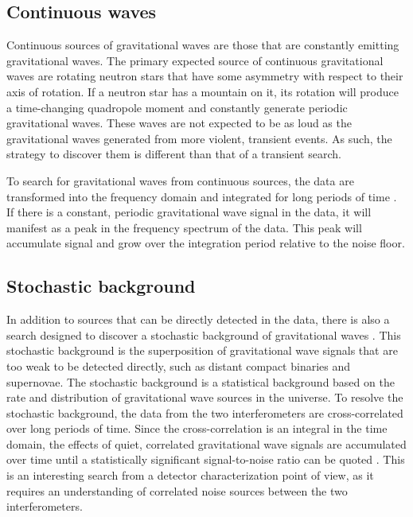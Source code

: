 \subsection{Continuous waves}

Continuous sources of gravitational waves are those that are constantly emitting 
gravitational waves. The primary expected source of continuous gravitational 
waves are rotating neutron stars that have some asymmetry with respect to their 
axis of rotation. If a neutron star has a mountain on it, its rotation will 
produce a time-changing quadropole moment and constantly generate periodic 
gravitational waves. These waves are not expected to be as loud as the 
gravitational waves generated from more violent, transient events. As such, 
the strategy to discover them is different than that of a transient search.

To search for gravitational waves from continuous sources, the data are 
transformed into the frequency domain and integrated for long periods of 
time \cite{CW-all-sky,EinsteinHome}. 
If there is a constant, periodic gravitational wave signal in the data, it 
will manifest as a peak in the frequency spectrum of the data. This peak will 
accumulate signal and grow over the integration period relative to the 
noise floor. 

\subsection{Stochastic background}

In addition to sources that can be directly detected in the data, there is 
also a search designed to discover a stochastic background of gravitational waves
 \cite{Collaboration:S4Stochastic,GW150914-STOCHASTIC}. 
This stochastic background is the superposition of gravitational wave signals that 
are too weak to be detected directly, such as distant compact binaries and 
supernovae. The stochastic background is a statistical background based on the 
rate and distribution of gravitational wave sources in the universe. To resolve 
the stochastic background, the data from the two interferometers are 
cross-correlated over long periods of time. Since the cross-correlation 
is an integral in the time domain, the effects of quiet, correlated 
gravitational wave signals are accumulated over time until a statistically 
significant signal-to-noise ratio can be quoted \cite{Allen1999Stoch}. 
This is an interesting search from a detector characterization point of view, 
as it requires an understanding of correlated noise sources between the two 
interferometers. 

